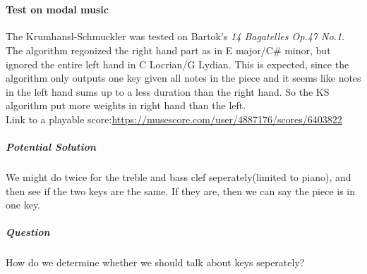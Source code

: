 \section*{}
\paragraph*{Test on modal music}
The Krumhansl-Schmuckler was tested on Bartok's \emph{14 Bagatelles Op.47 No.1}. The
algorithm regonized the right hand part as in E major/C\# minor, but ignored
the entire left hand in C Locrian/G Lydian. This is expected, since
the algorithm only outputs one key given all notes in the piece and 
it seems like notes in the left hand sums up to a less duration than
the right hand. So the KS algorithm put more weights in right hand than the
left. 
\\Link to a playable score:\url{https://musescore.com/user/4887176/scores/6403822}
\subparagraph*{Potential Solution}
We might do twice for the treble and bass clef seperately(limited to piano),
and then see if the two keys are the same. If they are, then we can say the
piece is in one key. 
\subparagraph*{Question}
How do we determine whether we should talk about keys seperately?

